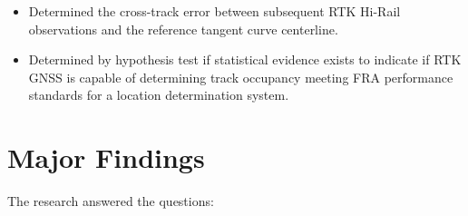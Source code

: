 \begin{enumerate}
\begin{itemize}
\item Determined the cross-track error between subsequent RTK Hi-Rail observations and the reference tangent curve centerline.

\item Determined by hypothesis test if statistical evidence exists to indicate if RTK GNSS is capable of determining track occupancy meeting FRA performance standards for a location determination system.
\end{itemize}
\end{enumerate}
\section{Major Findings}

The research answered the questions:
 
